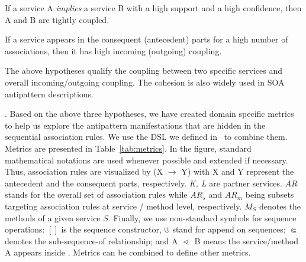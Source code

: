 \begin{conjecture}
If a service A \emph{implies} a service B with a high support and a high confidence, then
A and B are tightly coupled.
\end{conjecture}

\begin{conjecture}
If a service appears in the consequent (antecedent) parts for a high number of associations,
then it has high incoming (outgoing) coupling.
\end{conjecture}

\noindent The above hypotheses qualify the coupling between two specific
services and overall incoming/outgoing coupling. The cohesion is also widely used in
SOA antipattern descriptions. 
\begin{conjecture}
   
\end{conjecture}

\noindent {}. Based on the above three hypotheses, we have created domain specific metrics
to help us explore the antipattern manifestations that are hidden in the sequential association rules. We use the DSL we defined in~\cite{Moha12-ICSOC-SOASpecificationDetection} to combine them. Metrics are presented in Table~\ref{tab:metrics}. In the
figure, standard mathematical notations are used whenever possible
and extended if necessary. Thus, association rules are visualized
by (X $\rightarrow$ Y) with X and Y represent the antecedent and
the consequent parts, respectively. \emph{K, L} are partner services.
$AR$ stands for the overall set of association rules while $AR_{s}$
and $AR_{m}$ being subsets targeting association rules at service / method level, respectively. \emph{$M_{S}$}
denotes the methods of a given service $S$. Finally, we use non-standard
symbols for sequence operations: $[ ]$ is the sequence constructor,
$\Cup$ stand for append on sequences; $\Subset$ denotes the sub-sequence-of
relationship; and A $\lessdot$ B means the service/method A appears
inside . Metrics can be combined to define other metrics.



